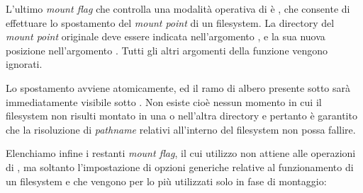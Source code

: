 L'ultimo \textit{mount flag} che controlla una modalità operativa di
 è , che consente di effettuare lo spostamento
del \textit{mount point} di un filesystem. La directory del \textit{mount
  point} originale deve essere indicata nell'argomento , e la
sua nuova posizione nell'argomento . Tutti gli altri argomenti
della funzione vengono ignorati.

Lo spostamento avviene atomicamente, ed il ramo di albero presente sotto
 sarà immediatamente visibile sotto . Non esiste
cioè nessun momento in cui il filesystem non risulti montato in una o
nell'altra directory e pertanto è garantito che la risoluzione di
\textit{pathname} relativi all'interno del filesystem non possa fallire.

Elenchiamo infine i restanti \textit{mount flag}, il cui utilizzo non attiene
alle operazioni di , ma soltanto l'impostazione di opzioni
generiche relative al funzionamento di un filesystem e che vengono per lo più
utilizzati solo in fase di montaggio:

